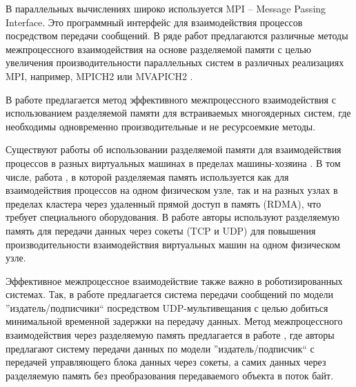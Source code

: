 В параллельных вычислениях широко используется MPI -- Message Passing Interface. Это программный интерфейс для взаимодействия процессов посредством передачи сообщений. В ряде работ предлагаются различные методы межпроцессного взаимодействия на основе разделяемой памяти с целью увеличения производительности параллельных систем в различных реализациях MPI, например, MPICH2 \cite{10.1007/11846802_19, 8665755} или MVAPICH2 \cite{4100356, 4663761}.

В работе \cite{HPCInterCoreLinux} предлагается метод эффективного межпроцессного взаимодействия с использованием разделяемой памяти для встраиваемых многоядерных систем, где необходимы одновременно производительные и не ресурсоемкие методы.

Существуют работы об использовании разделяемой памяти для взаимодействия процессов в разных виртуальных машинах в пределах машины-хозяина \cite{IPCInterVirtualMachineShmem, IPCInterVirtualMachineShmemOptimizations, 10.1145/2847562, 10.1007/978-3-642-00955-6_7}. В том числе, работа \cite{234795}, в которой разделяемая память используется как для взаимодействия процессов на одном физическом узле, так и на разных узлах в пределах кластера через удаленный прямой доступ в память (RDMA), что требует специального оборудования. В работе \cite{7416013} авторы используют разделяемую память для передачи данных через сокеты (TCP и UDP) для повышения производительности взаимодействия виртуальных машин на одном физическом узле.

Эффективное межпроцессное взаимодействие также важно в роботизированных системах. Так, в работе \cite{5649358} предлагается система передачи сообщений по модели ''издатель/подписчики`` посредством UDP-мультивещания с целью добиться минимальной временной задержки на передачу данных. Метод межпроцессного взаимодействия через разделяемую память предлагается в работе \cite{Wang2019TZCEI}, где авторы предлагают систему передачи данных по модели ''издатель/подписчик`` с передачей управляющего блока данных через сокеты, а самих данных через разделяемую память без преобразования передаваемого объекта в поток байт.

